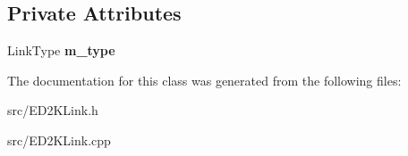 \subsection*{Private Attributes}
\begin{DoxyCompactItemize}
\item 
LinkType {\bfseries m\_\-type}\label{classCED2KLink_a60fd964f31c8c72c5e98eb2b751d44dd}

\end{DoxyCompactItemize}


The documentation for this class was generated from the following files:\begin{DoxyCompactItemize}
\item 
src/ED2KLink.h\item 
src/ED2KLink.cpp\end{DoxyCompactItemize}
